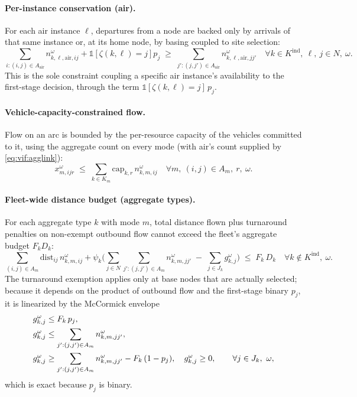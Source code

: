 \paragraph{Per-instance conservation (air).}
For each air instance $\ell$, departures from a node are backed only by
arrivals of that same instance or, at its home node, by basing coupled to site
selection:
\begin{equation}
\sum_{i:(i,j)\in A_{\text{air}}} n^\omega_{k,\ell,\text{air},ij}
  + \mathbb{1}\!\left[\zeta(k,\ell)=j\right] p_j
\;\geq\;
\sum_{j':(j,j')\in A_{\text{air}}} n^\omega_{k,\ell,\text{air},jj'}
\quad \forall k \in K^{\mathrm{ind}},\ \ell,\ j \in N,\ \omega.
\label{eq:vif:indvehcons}
\end{equation}
This is the sole constraint coupling a specific air instance's availability to
the first-stage decision, through the term
$\mathbb{1}[\zeta(k,\ell)=j]\,p_j$.

\paragraph{Vehicle-capacity-constrained flow.}
Flow on an arc is bounded by the per-resource capacity of the vehicles
committed to it, using the aggregate count on every mode (with air's count
supplied by \eqref{eq:vif:agglink}):
\begin{equation}
x^\omega_{m,ijr} \;\leq\; \sum_{k \in K_m} \text{cap}_{k,r}\, n^\omega_{k,m,ij}
\quad \forall m,\ (i,j) \in A_m,\ r,\ \omega.
\label{eq:vif:vehcap}
\end{equation}

\paragraph{Fleet-wide distance budget (aggregate types).}
For each aggregate type $k$ with mode $m$, total distance flown plus turnaround
penalties on non-exempt outbound flow cannot exceed the fleet's aggregate
budget $F_k D_k$:
\begin{equation}
\sum_{(i,j)\in A_m} \text{dist}_{ij}\, n^\omega_{k,m,ij}
+ \psi_k \Bigg( \sum_{j \in N} \sum_{j':(j,j')\in A_m} n^\omega_{k,m,jj'}
  \;-\; \sum_{j \in J_k} g^\omega_{k,j} \Bigg)
\;\leq\; F_k\, D_k
\quad \forall k \notin K^{\mathrm{ind}},\ \omega.
\label{eq:vif:distbudget}
\end{equation}
The turnaround exemption applies only at base nodes that are actually selected;
because it depends on the product of outbound flow and the first-stage binary
$p_j$, it is linearized by the McCormick envelope
\begin{align}
g^\omega_{k,j} &\leq F_k\, p_j, \label{eq:vif:mccormick} \\
g^\omega_{k,j} &\leq \sum_{j':(j,j')\in A_m} n^\omega_{k,m,jj'}, \notag \\
g^\omega_{k,j} &\geq \sum_{j':(j,j')\in A_m} n^\omega_{k,m,jj'} - F_k\,(1 - p_j),
  \quad g^\omega_{k,j} \geq 0,
  \qquad \forall j \in J_k,\ \omega, \notag
\end{align}
which is exact because $p_j$ is binary.

